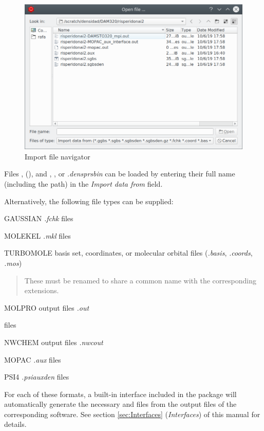 \documentclass[10pt]{article}
\begin{document}
\begin{figure}[H]
\begin{center}
\includegraphics[width=.6\linewidth]{damqt_fig_2_1_1.png}
\end{center}
\caption{Import file navigator \label{fig:2_1_1}}
\end{figure}

Files \ggbs{ }, (\sgbs{ }), and \den{ }, \dengz{ }, or {\it .densprsbin}
can be loaded by entering their full name (including the path)
in the {\it Import data from} field.

Alternatively, the following file types can be supplied:
\begin{itemize}
\item GAUSSIAN\footnotemark{} {\it .fchk} files
\item MOLEKEL {\it .mkl} files
\item TURBOMOLE basis set, coordinates, or molecular orbital files ({\it .basis}, {\it .coords}, {\it .mos})
\begin{quote}
\item These must be renamed to share a common name with the corresponding extensions.
\end{quote}
\item MOLPRO output files {\it .out}
\item \xml{ } files
\item NWCHEM output files {\it .nwcout}
\item MOPAC {\it .aux} files
\item PSI4 {\it .psiauxden} files
\end{itemize}

For each of these formats, a built-in interface included in the package
will automatically generate the necessary \ggbs{ } and \den{ } files from the output files
of the corresponding software. See section \ref{sec:Interfaces} ({\it Interfaces}) of this manual for details.
\end{document}
